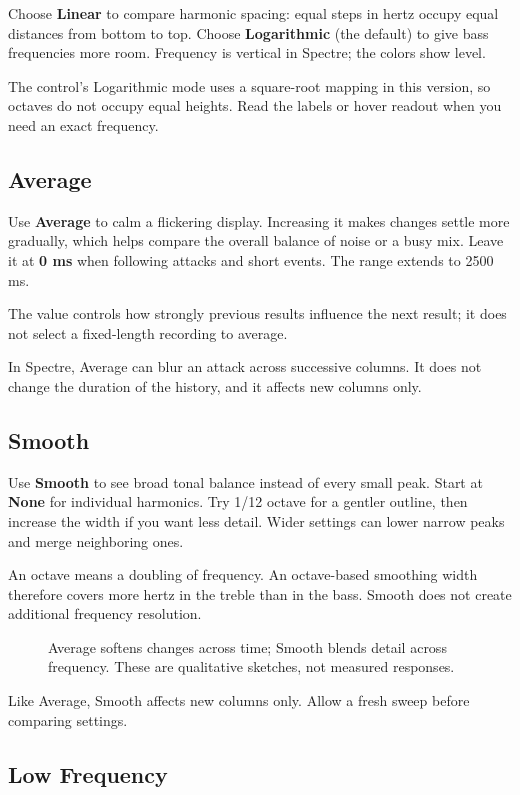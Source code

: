 Choose \textbf{Linear} to compare harmonic spacing: equal steps in hertz
occupy equal distances from bottom to top. Choose \textbf{Logarithmic}
(the default) to give bass frequencies more room. Frequency is vertical in
Spectre; the colors show level.

The control's Logarithmic mode uses a square-root mapping in this version,
so octaves do not occupy equal heights. Read the labels or hover readout
when you need an exact frequency.

\subsection{Average}
Use \textbf{Average} to calm a flickering display. Increasing it makes
changes settle more gradually, which helps compare the overall balance of
noise or a busy mix. Leave it at \textbf{0 ms} when following attacks and
short events. The range extends to 2500 ms.

The value controls how strongly previous results influence the next result;
it does not select a fixed-length recording to average.

In Spectre, Average can blur an attack across successive columns. It does
not change the duration of the history, and it affects new columns only.

\subsection{Smooth}
Use \textbf{Smooth} to see broad tonal balance instead of every small
peak. Start at \textbf{None} for individual harmonics. Try 1/12 octave for a
gentler outline, then increase the width if you want less detail. Wider
settings can lower narrow peaks and merge neighboring ones.

An octave means a doubling of frequency. An octave-based smoothing width
therefore covers more hertz in the treble than in the bass. Smooth does not
create additional frequency resolution.

\begin{figure}[!htp]
\centering

\caption{Average softens changes across time; Smooth blends detail across
frequency. These are qualitative sketches, not measured responses.}
\end{figure}

Like Average, Smooth affects new columns only. Allow a fresh sweep
before comparing settings.

\clearpage
\subsection{Low Frequency}

